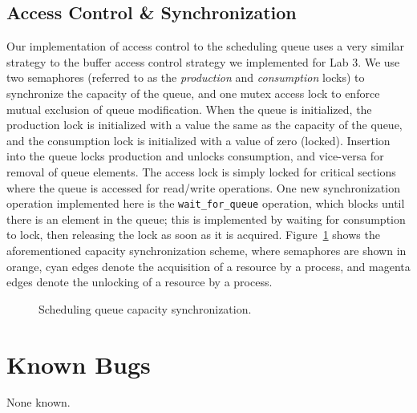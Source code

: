 \documentclass[paper=a4, fontsize=11pt]{scrartcl}
\begin{document}
\subsection*{Access Control \& Synchronization}
\label{design:sync}
Our implementation of access control to the scheduling queue uses a very similar strategy to the buffer access control strategy we implemented for Lab 3. We use two semaphores (referred to as the \textit{production} and \textit{consumption} locks) to synchronize the capacity of the queue, and one mutex access lock to enforce mutual exclusion of queue modification. When the queue is initialized, the production lock is initialized with a value the same as the capacity of the queue, and the consumption lock is initialized with a value of zero (locked). Insertion into the queue locks production and unlocks consumption, and vice-versa for removal of queue elements. The access lock is simply locked for critical sections where the queue is accessed for read/write operations. One new synchronization operation implemented here is the \texttt{wait\_for\_queue} operation, which blocks until there is an element in the queue; this is implemented by waiting for consumption to lock, then releasing the lock as soon as it is acquired. Figure~\ref{fig:qsync} shows the aforementioned capacity synchronization scheme, where semaphores are shown in orange, cyan edges denote the acquisition of a resource by a process, and magenta edges denote the unlocking of a resource by a process.

\begin{figure}[h]
  \centering
  \caption{Scheduling queue capacity synchronization.}
  \label{fig:qsync}
\end{figure}

\section*{Known Bugs}
None known.
\end{document}
